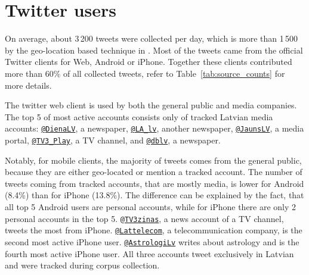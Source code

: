 \documentclass{IOS-Book-Article}
\makeatletter
\newcommand{\hl}[1]{#1}
\newcommand{\sn}[1]{\href{https://twitter.com/#1}{\texttt{@#1}}}
\makeatother
\begin{document}
\section{Twitter users}
\label{sec:global-analysis}



On average, about \hl{3\,200} tweets were collected per day, which is more than 1\,500 by the geo-location based technique in \cite{milajevs:2017:BUCC}. Most of the tweets came from the official Twitter clients for Web, Android or iPhone. Together these clients contributed more than 60\% of all collected tweets, refer to Table~\ref{tab:source_counts} for more details.

The twitter web client is used by both the general public and media companies. The top 5 of most active accounts consists only of tracked Latvian media accounts: \sn{DienaLV}, a newspaper, \sn{LA\_lv}, another newspaper, \sn{JaunsLV}, a media portal, \sn{TV3\_Play}, a TV channel, and \sn{dblv}, a newspaper.

Notably, for mobile clients, the majority of tweets comes from the general public, because they are either geo-located or mention a tracked account. The number of tweets coming from tracked accounts, that are mostly media, is lower for Android \hl{(8.4\%)} than for iPhone \hl{(13.8\%)}. The difference can be explained by the fact, that all top 5 Android users are personal accounts, while for iPhone there are only 2 personal accounts in the top 5. \sn{TV3zinas}, a news account of a TV channel, tweets the most from iPhone. \sn{Lattelecom}, a telecommunication company, is the second most active iPhone user. \sn{AstrologiLv} writes about astrology and is the fourth most active iPhone user. All three accounts tweet exclusively in Latvian and were tracked during corpus collection.


\end{document}
